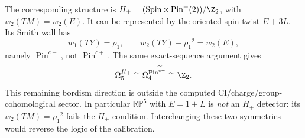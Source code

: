 The corresponding structure is
$H_+=(\operatorname{Spin}\times\operatorname{Pin}^+(2))/\Z_2$,
with $w_2(TM)=w_2(E)$. It can be represented by the oriented spin twist $E+3L$. Its Smith wall has
\begin{equation}
 w_1(TY)={\rho_1},\qquad w_2(TY)+{\rho_1}^2=w_2(E),
\end{equation}
namely $\operatorname{Pin}^{\widetilde c-}$, not $\operatorname{Pin}^{\widetilde c+}$. The same exact-sequence argument gives
\begin{equation}
                   \Omega_5^{H_+}\cong\Omega_4^{\operatorname{Pin}^{\widetilde c-}}
                        \cong\Z_2.
\end{equation}
This remaining bordism direction is outside the computed CI/charge/group-cohomological sector. In particular $\mathbb{RP}^5$ with $E=1+L$ is \emph{not} an $H_+$ detector: its $w_2(TM)={\rho_1}^2$ fails the $H_+$ condition. Interchanging these two symmetries would reverse the logic of the calibration.
